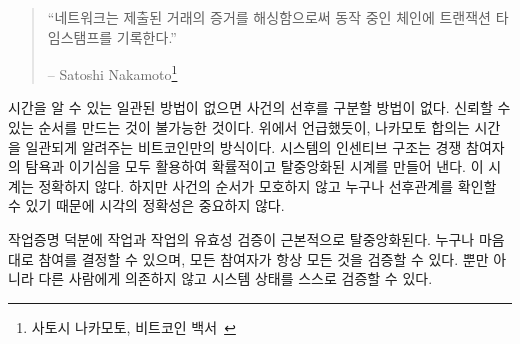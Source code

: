 \begin{quotation}\begin{samepage}
		\enquote{네트워크는 제출된 거래의 증거를 해싱함으로써 동작 중인 체인에 트랜잭션 타임스탬프를 기록한다.}
		\begin{flushright} -- Satoshi Nakamoto\footnote{사토시 나카모토, 비트코인 백서~\cite{whitepaper}}
\end{flushright}\end{samepage}\end{quotation}

\begin{comment}
	Without a consistent way to tell the time, there is no consistent way to
	tell before from after. Reliable ordering is impossible. As mentioned
	above, Nakamoto consensus is Bitcoin's way to consistently tell the
	time. The system's incentive structure produces a probabilistic,
	decentralized clock, by utilizing both greed and self-interest of
	competing participants. The fact that this clock is imprecise is
	irrelevant because the order of events is eventually unambiguous and can
	be verified by anyone.
\end{comment}
시간을 알 수 있는 일관된 방법이 없으면 사건의 선후를 구분할 방법이 없다.
신뢰할 수 있는 순서를 만드는 것이 불가능한 것이다.
위에서 언급했듯이, 나카모토 합의는 시간을 일관되게 알려주는 비트코인만의 방식이다.
시스템의 인센티브 구조는 경쟁 참여자의 탐욕과 이기심을 모두 활용하여 확률적이고 탈중앙화된 시계를 만들어 낸다.
이 시계는 정확하지 않다. 하지만 사건의 순서가 모호하지 않고 누구나 선후관계를 확인할 수 있기 때문에 시각의 정확성은 중요하지 않다.

\begin{comment}
	Thanks to proof-of-work, both the work \textit{and} the validation of the work
	are radically decentralized. Everyone can join and leave at will, and
	everyone can validate everything at all times. Not only that, but
	everyone can validate the state of the system \textit{individually}, without
	having to rely on anyone else for validation.
\end{comment}
작업증명 덕분에 작업과 작업의 유효성 검증이 근본적으로 탈중앙화된다. 
누구나 마음대로 참여를 결정할 수 있으며, 모든 참여자가 항상 모든 것을 검증할 수 있다. 
뿐만 아니라 다른 사람에게 의존하지 않고 시스템 상태를 스스로 검증할 수 있다.


